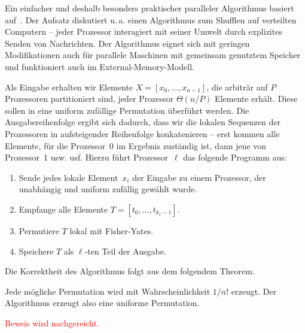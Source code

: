 Ein einfacher und deshalb besonders praktischer paralleler Algorithmus basiert auf~\cite{SANDERS2016489}.
Der Aufsatz diskutiert u.\,a. einen Algorithmus zum Shufflen auf verteilten Computern --
jeder Prozessor interagiert mit seiner Umwelt durch explizites Senden von Nachrichten.
Der Algorithmus eignet sich mit geringen Modifikationen auch für parallele Maschinen mit gemeinsam genutztem Speicher und funktioniert auch im External-Memory-Modell.

Als Eingabe erhalten wir Elemente $X=[x_0, \ldots, x_{n-1}]$, die arbiträr auf $P$ Prozessoren partitioniert sind, \sd jeder Prozessor $\Theta(n/P)$ Elemente erhält.
Diese sollen in eine uniform zufällige Permutation überführt werden.
Die Ausgabereihenfolge ergibt sich dadurch, dass wir die lokalen Sequenzen der Prozessoren in aufsteigender Reihenfolge konkatenieren --
erst kommen alle Elemente, für die Prozessor~0 im Ergebnis zuständig ist, dann jene von Prozessor~1 usw. usf.
Hierzu führt Prozessor~$\ell$ das folgende Programm aus:

\begin{enumerate}
    \item Sende jedes lokale Element~$x_i$ der Eingabe zu einem Prozessor, der unabhängig und uniform zufällig gewählt wurde.
    \item Empfange alle Elemente $T = [t_0, \ldots, t_{k_\ell-1}]$.
          \iffalse\item Berechne die Präfixsumme $\Delta_\ell = \sum_{i=0}^{\ell - 1} k_i$.
          Der Wert $\Delta_\ell$ entspricht dann der Position des ersten Elements von Prozessor~$\ell$ in der Ausgabe.\fi
    \item Permutiere $T$ lokal \zB mit Fisher-Yates.
    \item Speichere $T$ als $\ell$-ten Teil der Ausgabe.
\end{enumerate}

Die Korrektheit des Algorithmus folgt aus dem folgendem Theorem.

\begin{theorem}
    Jede mögliche Permutation wird mit Wahrscheinlichkeit $1/n!$ erzeugt.
    Der Algorithmus erzeugt also eine uniforme Permutation.
\end{theorem}

\noindent
\textcolor{red}{Beweis wird nachgereicht.}

